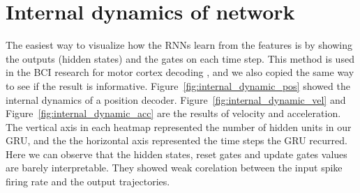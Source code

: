 \newpage
\section{Internal dynamics of network}
\label{sec:internal_dynamics_of_network}

The easiest way to visualize how the RNNs learn from the features is by showing the outputs (hidden states) and the gates on each time step.
This method is used in the BCI research for motor cortex decoding \citep{tseng2019decoding},
and we also copied the same way to see if the result is informative.
Figure~\ref{fig:internal_dynamic_pos} showed the internal dynamics of a position decoder.
Figure~\ref{fig:internal_dynamic_vel} and Figure~\ref{fig:internal_dynamic_acc} are the results of velocity and acceleration.
The vertical axis in each heatmap represented the number of hidden units in our GRU,
and the the horizontal axis represented the time steps the GRU recurred.
Here we can observe that the hidden states, 
reset gates and update gates values are barely interpretable.
They showed weak corelation between the input spike firing rate and the output trajectories.




